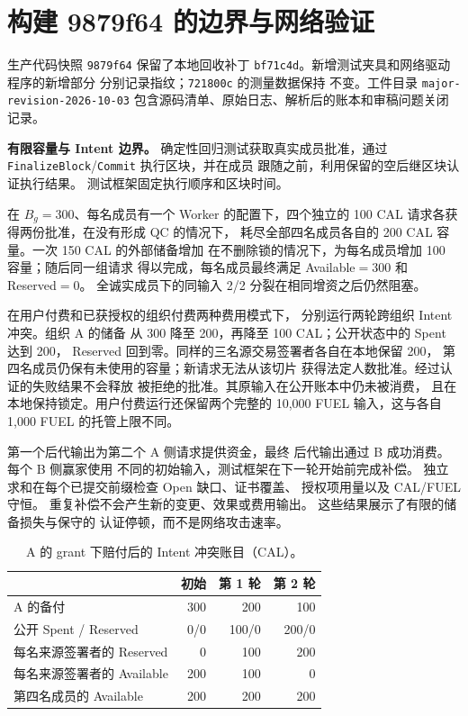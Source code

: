 \section{构建 9879f64 的边界与网络验证}
\label{supp:major-revision}
生产代码快照 \texttt{9879f64} 保留了本地回收补丁
\texttt{bf71c4d}。新增测试夹具和网络驱动程序的新增部分
分别记录指纹；\texttt{721800c} 的测量数据保持
不变。工件目录 \texttt{major-revision-2026-10-03}
包含源码清单、原始日志、解析后的账本和审稿问题关闭记录。

\noindent\textbf{有限容量与 Intent 边界。}
确定性回归测试获取真实成员批准，通过
\texttt{FinalizeBlock}/\texttt{Commit} 执行区块，并在成员
跟随之前，利用保留的空后继区块认证执行结果。
测试框架固定执行顺序和区块时间。

在 $B_g=300$、每名成员有一个 Worker 的配置下，四个独立的
100 CAL 请求各获得两份批准，在没有形成 QC 的情况下，
耗尽全部四名成员各自的 200 CAL 容量。一次 150 CAL 的外部储备增加
在不删除锁的情况下，为每名成员增加 100 容量；随后同一组请求
得以完成，每名成员最终满足 Available$=300$ 和 Reserved$=0$。
全诚实成员下的同输入 2/2 分裂在相同增资之后仍然阻塞。

在用户付费和已获授权的组织付费两种费用模式下，
分别运行两轮跨组织 Intent 冲突。组织 A 的储备
从 300 降至 200，再降至 100 CAL；公开状态中的 Spent 达到 200，
Reserved 回到零。同样的三名源交易签署者各自在本地保留 200，
第四名成员仍保有未使用的容量；新请求无法从该切片
获得法定人数批准。经过认证的失败结果不会释放
被拒绝的批准。其原输入在公开账本中仍未被消费，
且在本地保持锁定。用户付费运行还保留两个完整的
10,000 FUEL 输入，这与各自 1,000 FUEL 的托管上限不同。

第一个后代输出为第二个 A 侧请求提供资金，最终
后代输出通过 B 成功消费。每个 B 侧赢家使用
不同的初始输入，测试框架在下一轮开始前完成补偿。
独立求和在每个已提交前缀检查 Open 缺口、证书覆盖、
授权项用量以及 CAL/FUEL 守恒。
重复补偿不会产生新的变更、效果或费用输出。
这些结果展示了有限的储备损失与保守的
认证停顿，而不是网络攻击速率。


\begin{table}[!t]
\caption{A 的 grant 下赔付后的 Intent 冲突账目（CAL）。}
\label{tab:s3-ledger}
\centering\small
\begin{tabular}{@{}lrrr@{}}
\toprule
 & 初始 & 第 1 轮 & 第 2 轮 \\
\midrule
A 的备付 & 300 & 200 & 100 \\
公开 Spent / Reserved & 0/0 & 100/0 & 200/0 \\
每名来源签署者的 Reserved & 0 & 100 & 200 \\
每名来源签署者的 Available & 200 & 100 & 0 \\
第四名成员的 Available & 200 & 200 & 200 \\
\bottomrule
\end{tabular}
\end{table}

